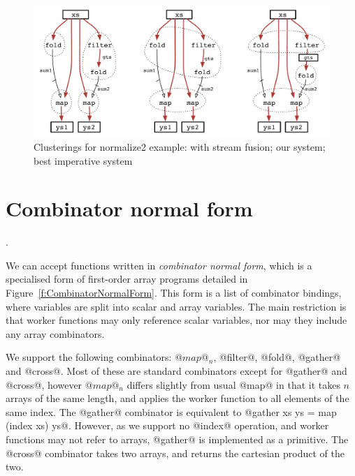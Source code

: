 
\begin{figure}[ht!]
\begin{center}
\includegraphics[scale=0.5]{figures/ex1-compare.pdf}
\end{center}

\caption{Clusterings for normalize2 example: with stream fusion; our system; best imperative system}
\label{f:normalize2-cluterings}
\end{figure}


\section{Combinator normal form}
. 

We can accept functions written in \emph{combinator normal form}, which is a specialised form of first-order array programs detailed in Figure~\ref{f:CombinatorNormalForm}.
This form is a list of combinator bindings, where variables are split into scalar and array variables.
The main restriction is that worker functions may only reference scalar variables, nor may they include any array combinators.

We support the following combinators: $@map@_n$, @filter@, @fold@, @gather@ and @cross@.
Most of these are standard combinators except for @gather@ and @cross@, however $@map@_n$ differs slightly from usual @map@ in that it takes $n$ arrays of the same length, and applies the worker function to all elements of the same index.
The @gather@ combinator is equivalent to @gather xs ys = map (index xs) ys@.
However, as we support no @index@ operation, and worker functions may not refer to arrays, @gather@ is implemented as a primitive.
The @cross@ combinator takes two arrays, and returns the cartesian product of the two.

